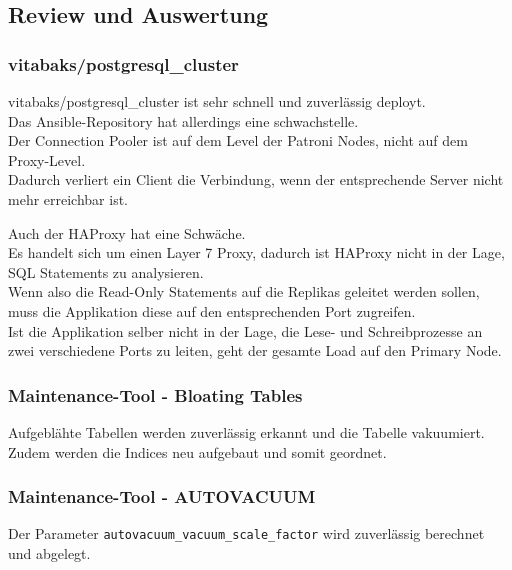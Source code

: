 
\begin{flushleft}
    \subsection{Review und Auswertung}
    \subsubsection{vitabaks/postgresql\_cluster}
    vitabaks/postgresql\_cluster ist sehr schnell und zuverlässig deployt.\\
    Das \Gls{Ansible}-Repository hat allerdings eine schwachstelle.\\
    Der \Gls{Connection Pooler} ist auf dem Level der Patroni Nodes, nicht auf dem Proxy-Level.\\
    Dadurch verliert ein Client die Verbindung, wenn der entsprechende Server nicht mehr erreichbar ist.
\end{flushleft}
\begin{flushleft}
    Auch der \Gls{HAProxy} hat eine Schwäche.\\
    Es handelt sich um einen Layer 7 Proxy, dadurch ist \Gls{HAProxy} nicht in der Lage, SQL Statements zu analysieren.\\
    Wenn also die Read-Only Statements auf die Replikas geleitet werden sollen, muss die Applikation diese auf den entsprechenden Port zugreifen.\\
    Ist die Applikation selber nicht in der Lage, die Lese- und Schreibprozesse an zwei verschiedene Ports zu leiten, geht der gesamte Load auf den Primary Node.
\end{flushleft}
\begin{flushleft}
    \subsubsection{Maintenance-Tool - Bloating Tables}
    Aufgeblähte Tabellen werden zuverlässig erkannt und die Tabelle vakuumiert.\\
    Zudem werden die Indices neu aufgebaut und somit geordnet.
    \subsubsection{Maintenance-Tool - \Gls{AUTOVACUUM}}
    Der Parameter \texttt{autovacuum\_vacuum\_scale\_factor} wird zuverlässig berechnet und abgelegt.
\end{flushleft}